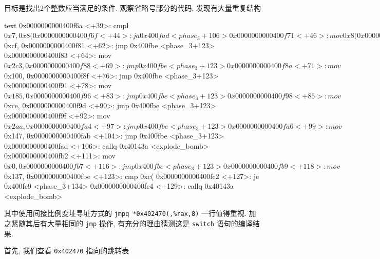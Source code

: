 目标是找出2个整数应当满足的条件. 观察省略号部分的代码, 发现有大量重复结构
\begin{code}{text}
   0x0000000000400f6a <+39>:    cmpl   $0x7,0x8(%
   0x0000000000400f6f <+44>:    ja     0x400fad <phase_3+106>
   0x0000000000400f71 <+46>:    mov    0x8(%
   0x0000000000400f75 <+50>:    jmpq   *0x402470(,%
   0x0000000000400f7c <+57>:    mov    $0xcf,%
   0x0000000000400f81 <+62>:    jmp    0x400fbe <phase_3+123>
   0x0000000000400f83 <+64>:    mov    $0x2c3,%
   0x0000000000400f88 <+69>:    jmp    0x400fbe <phase_3+123>
   0x0000000000400f8a <+71>:    mov    $0x100,%
   0x0000000000400f8f <+76>:    jmp    0x400fbe <phase_3+123>
   0x0000000000400f91 <+78>:    mov    $0x185,%
   0x0000000000400f96 <+83>:    jmp    0x400fbe <phase_3+123>
   0x0000000000400f98 <+85>:    mov    $0xce,%
   0x0000000000400f9d <+90>:    jmp    0x400fbe <phase_3+123>
   0x0000000000400f9f <+92>:    mov    $0x2aa,%
   0x0000000000400fa4 <+97>:    jmp    0x400fbe <phase_3+123>
   0x0000000000400fa6 <+99>:    mov    $0x147,%
   0x0000000000400fab <+104>:   jmp    0x400fbe <phase_3+123>
   0x0000000000400fad <+106>:   callq  0x40143a <explode_bomb>
   0x0000000000400fb2 <+111>:   mov    $0x0,%
   0x0000000000400fb7 <+116>:   jmp    0x400fbe <phase_3+123>
   0x0000000000400fb9 <+118>:   mov    $0x137,%
   0x0000000000400fbe <+123>:   cmp    0xc(%
   0x0000000000400fc2 <+127>:   je     0x400fc9 <phase_3+134>
   0x0000000000400fc4 <+129>:   callq  0x40143a <explode_bomb>
\end{code}
其中使用间接比例变址寻址方式的 \verb|jmpq *0x402470(,%rax,8)| 一行值得重视. 加之紧随其后有大量相同的 \verb|jmp| 操作, 有充分的理由猜测这是 \verb|switch| 语句的编译结果. 

首先, 我们查看 \verb|0x402470| 指向的跳转表

